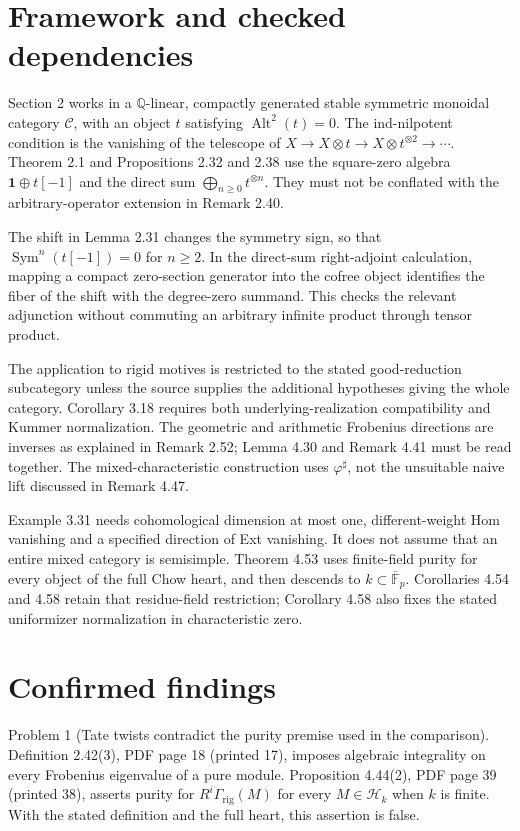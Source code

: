 \documentclass[10pt]{article}
\begin{document}
\section*{Framework and checked dependencies}
Section 2 works in a \(\mathbb Q\)-linear, compactly generated stable symmetric monoidal category \(\mathcal C\), with an object \(t\) satisfying \(\operatorname{Alt}^2(t)=0\). The ind-nilpotent condition is the vanishing of the telescope of \(X\to X\otimes t\to X\otimes t^{\otimes2}\to\cdots\). Theorem 2.1 and Propositions 2.32 and 2.38 use the square-zero algebra \(\mathbf 1\oplus t[-1]\) and the direct sum \(\bigoplus_{n\ge0}t^{\otimes n}\). They must not be conflated with the arbitrary-operator extension in Remark 2.40.\par
The shift in Lemma 2.31 changes the symmetry sign, so that \(\operatorname{Sym}^n(t[-1])=0\) for \(n\ge2\). In the direct-sum right-adjoint calculation, mapping a compact zero-section generator into the cofree object identifies the fiber of the shift with the degree-zero summand. This checks the relevant adjunction without commuting an arbitrary infinite product through tensor product.\par
The application to rigid motives is restricted to the stated good-reduction subcategory unless the source supplies the additional hypotheses giving the whole category. Corollary 3.18 requires both underlying-realization compatibility and Kummer normalization. The geometric and arithmetic Frobenius directions are inverses as explained in Remark 2.52; Lemma 4.30 and Remark 4.41 must be read together. The mixed-characteristic construction uses \(\varphi^\sharp\), not the unsuitable naive lift discussed in Remark 4.47.\par
Example 3.31 needs cohomological dimension at most one, different-weight Hom vanishing and a specified direction of Ext vanishing. It does not assume that an entire mixed category is semisimple. Theorem 4.53 uses finite-field purity for every object of the full Chow heart, and then descends to \(k\subset\overline{\mathbb F}_p\). Corollaries 4.54 and 4.58 retain that residue-field restriction; Corollary 4.58 also fixes the stated uniformizer normalization in characteristic zero.\par
\section*{Confirmed findings}
Problem 1 (Tate twists contradict the purity premise used in the comparison).  Definition 2.42(3), PDF page 18 (printed 17), imposes algebraic integrality on every Frobenius eigenvalue of a pure module. Proposition 4.44(2), PDF page 39 (printed 38), asserts purity for \(R^i\Gamma_{\mathrm{rig}}(M)\) for every \(M\in\mathcal H_k\) when \(k\) is finite. With the stated definition and the full heart, this assertion is false.\par
\end{document}
